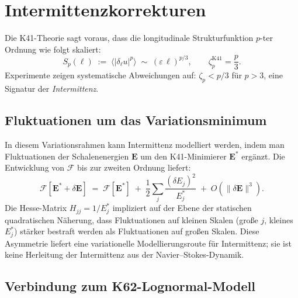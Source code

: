\documentclass[12pt,a4paper]{article}
\theoremstyle{definition}
\theoremstyle{plain}
\theoremstyle{remark}
\begin{document}
\section{Intermittenzkorrekturen}\label{sec:intermittency}

Die K41-Theorie sagt voraus, dass die longitudinale Strukturfunktion $p$-ter Ordnung wie folgt skaliert:
\begin{equation}\label{eq:Sp_K41}
  S_p(\ell) \;:=\;
  \bigl\langle |\delta_\ell u|^p \bigr\rangle
  \;\sim\; (\varepsilon\,\ell)^{p/3},
  \qquad
  \zeta_p^{\mathrm{K41}} = \frac{p}{3}.
\end{equation}
Experimente zeigen systematische Abweichungen auf: $\zeta_p < p/3$ für $p > 3$,
eine Signatur der \emph{Intermittenz}.

\subsection{Fluktuationen um das Variationsminimum}

In diesem Variationsrahmen kann Intermittenz modelliert werden, indem man
Fluktuationen der Schalenenergien $\mathbf{E}$ um den K41-Minimierer
$\mathbf{E}^*$ ergänzt. Die Entwicklung von $\mathcal{F}$ bis zur zweiten
Ordnung liefert:
\begin{equation}\label{eq:F_expand}
  \mathcal{F}[\mathbf{E}^* + \delta\mathbf{E}]
  \;=\;
  \mathcal{F}[\mathbf{E}^*]
  \;+\;
  \frac{1}{2}\sum_{j}
    \frac{(\delta E_j)^2}{E_j^*}
  \;+\; O(\|\delta\mathbf{E}\|^3).
\end{equation}
Die Hesse-Matrix $H_{jj} = 1/E_j^*$ impliziert auf der Ebene der statischen
quadratischen Näherung, dass Fluktuationen auf kleinen Skalen (große $j$,
kleines $E_j^*$) stärker bestraft werden als Fluktuationen auf großen
Skalen. Diese Asymmetrie liefert eine variationelle Modellierungsroute für
Intermittenz; sie ist keine Herleitung der Intermittenz aus der
Navier--Stokes-Dynamik.

\subsection{Verbindung zum K62-Lognormal-Modell}
\end{document}

